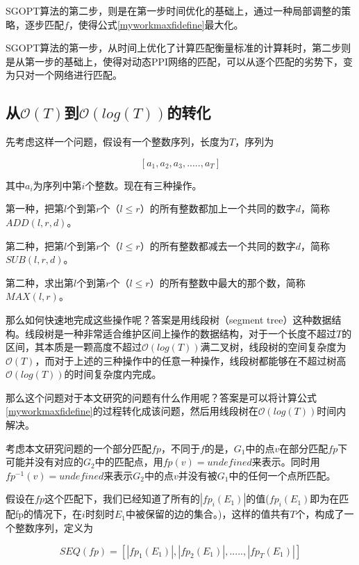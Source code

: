 SGOPT算法的第二步，则是在第一步时间优化的基础上，通过一种局部调整的策略，逐步匹配$f$，使得公式\ref{myworkmaxfidefine}最大化。

SGOPT算法的第一步，从时间上优化了计算匹配衡量标准的计算耗时，第二步则是从第一步的基础上，使得对动态PPI网络的匹配，可以从逐个匹配的劣势下，变为只对一个网络进行匹配。

\subsection{从$\mathcal{O}(T)$到$\mathcal{O}(log(T))$的转化}
先考虑这样一个问题，假设有一个整数序列，长度为$T$，序列为

\begin{equation}\label{myworkseqdefine}    
[a_1,a_2,a_3,.....,a_T]
\end{equation}

其中$a_i$为序列中第$i$个整数。现在有三种操作。

第一种，把第$l$个到第$r$个（$l\leq r$）的所有整数都加上一个共同的数字$d$，简称$ADD(l,r,d)$。

第二种，把第$l$个到第$r$个（$l\leq r$）的所有整数都减去一个共同的数字$d$，简称$SUB(l,r,d)$。

第二种，求出第$l$个到第$r$个（$l\leq r$）的所有整数中最大的那个数，简称$MAX(l,r)$。

那么如何快速地完成这些操作呢？答案是用线段树（segment tree）这种数据结构\cite{de2000computational}。线段树是一种非常适合维护区间上操作的数据结构，对于一个长度不超过$T$的区间，其本质是一颗高度不超过$\mathcal{O}(log(T))$满二叉树，线段树的空间复杂度为$\mathcal{O}(T)$，而对于上述的三种操作中的任意一种操作，线段树都能够在不超过树高$\mathcal{O}(log(T))$的时间复杂度内完成。

那么这个问题对于本文研究的问题有什么作用呢？答案是可以将计算公式\ref{myworkmaxfidefine}的过程转化成该问题，然后用线段树在$\mathcal{O}(log(T))$时间内解决。

考虑本文研究问题的一个部分匹配$fp$，不同于$f$的是，$G_1$中的点$v$在部分匹配$fp$下可能并没有对应的$G_2$中的匹配点，用$fp(v)=undefined$来表示。同时用$fp^{-1}(v)=undefined$来表示$G_2$中的点$v$并没有被$G_1$中的任何一个点所匹配。

假设在$fp$这个匹配下，我们已经知道了所有的$|fp_i(E_1)|$的值($fp_i(E_1)$即为在匹配fp的情况下，在$i$时刻时$E_1$中被保留的边的集合。)，这样的值共有$T$个，构成了一个整数序列，定义为

\begin{equation}\label{myworkfseqdefine}    
SEQ(fp)=[|fp_1(E_1)|,|fp_2(E_1)|,.....,|fp_T(E_1)|]
\end{equation}

